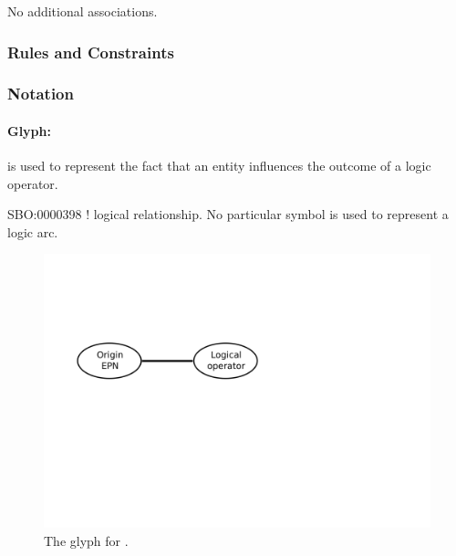 No additional associations.

\subsubsection{Rules and Constraints}

\begin{valrules}
\end{valrules}


\subsubsection{Notation}

\paragraph{Glyph:  }\label{sec:techref:logicArc}

 is used to represent the fact that an entity influences
the outcome of a logic operator.

\begin{glyphDescription}
 \glyphSboTerm SBO:0000398 ! logical relationship.
 \glyphEndPoint No particular symbol is used to represent a logic arc.
 \end{glyphDescription}

\begin{figure}[htb]
  \centering
  \includegraphics[scale = 0.4]{images/logicArc}
  \caption{The \PD glyph for .}
  \label{fig:techref:logicArc}
\end{figure}

